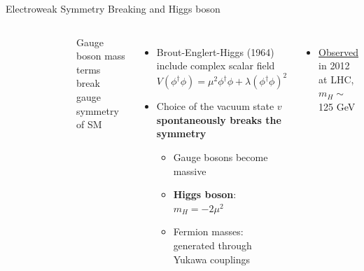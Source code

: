 \begin{frame}{Electroweak Symmetry Breaking and Higgs boson}
\begin{columns}
{\begin{figure}
\end{figure}
}
Gauge boson mass terms break gauge symmetry of SM
\begin{itemize}
    \item \textcolor{structurColor}{Brout-Englert-Higgs (1964)} include complex scalar field
    \begin{equation*}
        V(\phi^\dagger\phi) = \mu^2\phi^\dagger\phi + \lambda(\phi^\dagger\phi)^2
    \end{equation*}
    \pause
    \item Choice of the vacuum state $v$ \textbf{\textcolor{applegreen}{spontaneously breaks the symmetry}}
    \begin{itemize}
        \item Gauge bosons become massive
        \item \textbf{Higgs boson}: $m_{H}= -2\mu^2$
        \item Fermion masses: generated through Yukawa couplings
    \end{itemize}
\end{itemize}

\begin{itemize}
    \item \underline{Observed} in 2012 at LHC, $m_{H} \sim $ 125 GeV
\end{itemize}
\end{columns}
\end{frame}

